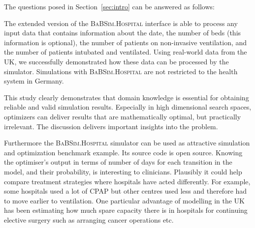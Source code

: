 \documentclass[conference]{IEEEtran}
\newcommand{\babsimhospital}{\textsc{BaBSim.Hospital}\xspace}
\begin{document}
The questions posed in Section~\ref{sec:intro} can be answered as follows:
\begin{compactenum}[(Q-1)]
\item The extended version of the \babsimhospital interface is able to process any input data that contains information about the date, the number of beds (this information is optional), the number of patients on non-invasive ventilation, and the number of patients intubated and ventilated. Using real-world data from the UK, we successfully demonstrated how these data can be processed by the simulator. Simulations with \babsimhospital are not restricted to the health system in Germany.
\item This study clearly demonstrates that domain knowledge is essential for obtaining reliable and valid simulation results. Especially in high dimensional search spaces, optimizers can deliver results that are mathematically optimal, but practically irrelevant. The discussion delivers important insights into the problem. 
\end{compactenum}
Furthermore the \babsimhospital simulator can be used as attractive simulation and optimization benchmark example. Its source code is open source. 
Knowing the optimiser's output in terms of number of days for each transition in the model, and their probability, is interesting to clinicians. Plausibly it could help compare treatment strategies where hospitals have acted differently. For example, some hospitals used a lot of \gls{CPAP} but other centres used less and therefore had to move earlier to ventilation.
One particular advantage of modelling in the UK has been estimating how much spare capacity there is in hospitals for continuing elective surgery such as arranging cancer operations etc.






\end{document}
